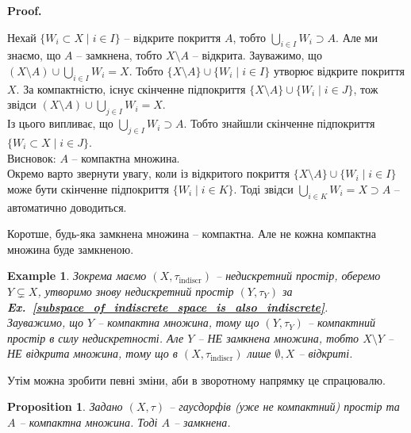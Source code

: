 \documentclass[a4paper, 10pt]{article}
\makeatletter
\theoremstyle{theoremdd}
\newtheorem{example}[theorem]{Example}
\newtheorem{proposition}[theorem]{Proposition}
\newcommand\exref[1]{\textbf{Ex.~\ref{#1}}}
\renewenvironment{proof}[1][Proof.\\]{\par
\pushQED{\hfill \qed}%
\normalfont \topsep6\p@\@plus6\p@\relax
\trivlist
\item\relax
{\bfseries
#1\@addpunct{.}}\hspace\labelsep\ignorespaces
}{%
\popQED\endtrivlist\@endpefalse
}
\makeatother
\begin{document}
\begin{proof}
Нехай $\{W_i \subset X \mid i \in I\}$ -- відкрите покриття $A$, тобто $\displaystyle\bigcup_{i \in I} W_i \supset A$. Але ми знаємо, що $A$ -- замкнена, тобто $X \setminus A$ -- відкрита. Зауважимо, що $\displaystyle (X \setminus A) \cup \bigcup_{i \in I} W_i = X$. Тобто $\{X \setminus A\} \cup \{W_i \mid i \in I\}$ утворює відкрите покриття $X$. За компактністю, існує скінченне підпокриття $\{X \setminus A\} \cup \{W_i \mid i \in J\}$, тож звідси $\displaystyle (X \setminus A) \cup \bigcup_{j \in I} W_i = X$.\\
Із цього випливає, що $\displaystyle\bigcup_{j \in I} W_i \supset A$. Тобто знайшли скінченне підпокриття $\{W_i \subset X \mid i \in J\}$.\\
Висновок: $A$ -- компактна множина.
\bigskip \\
Окремо варто звернути увагу, коли із відкритого покриття $\{X \setminus A\} \cup \{W_i \mid i \in I\}$ може бути скінченне підпокриття $\{W_i \mid i \in K\}$. Тоді звідси $\displaystyle\bigcup_{i \in K} W_i = X \supset A$ --  автоматично доводиться.
\end{proof}

\noindent Коротше, будь-яка замкнена множина -- компактна. Але не кожна компактна множина буде замкненою.

\begin{example}
Зокрема маємо $(X,\tau_{\text{indiscr}})$ -- недискретний простір, оберемо $Y \subsetneq X$, утворимо знову недискретний простір $(Y,\tau_Y)$ за \exref{subspace_of_indiscrete_space_is_also_indiscrete}.\\
Зауважимо, що $Y$ -- компактна множина, тому що $(Y,\tau_Y)$ -- компактний простір в силу недискретності. Але $Y$ -- НЕ замкнена множина, тобто $X \setminus Y$ -- НЕ відкрита множина, тому що в $(X,\tau_{\text{indiscr}})$ лише $\emptyset,X$ -- відкриті.
\end{example}
\noindent
Утім можна зробити певні зміни, аби в зворотному напрямку це спрацювалю.

\begin{proposition}
Задано $(X,\tau)$ -- гаусдорфів (уже не компактний) простір та $A$ -- компактна множина. Тоді $A$ -- замкнена.
\end{proposition}
\end{document}
